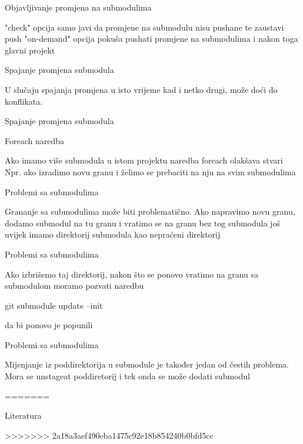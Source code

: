 \documentclass[10pt]{beamer}
\begin{document}
\begin{frame}[fragile]{Objavljivanje promjena na submodulima}
    
    "check" opcija samo javi da promjene na submodulu nisu pushane te zaustavi push
    "on-demand" opcija pokuša pushati promjene na submodulima i nakon toga glavni projekt
    
\end{frame}

\begin{frame}[fragile]{Spajanje promjena submodula}
    
    U slučaju spajanja promjena u isto vrijeme kad i netko drugi, može doći do konflikata.
    
    
\end{frame}

\begin{frame}[fragile]{Spajanje promjena submodula}
    
    
    
\end{frame}

\begin{frame}[fragile]{Foreach naredba}
    
    Ako imamo više submodula u istom projektu naredba foreach olakšava stvari
	Npr. ako izradimo novu granu i želimo se prebaciti na nju na svim submodulima
	
    
\end{frame}

\begin{frame}[fragile]{Problemi sa submodulima}
    
    Grananje sa submodulima može biti problematično.
    Ako napravimo novu granu, dodamo submodul na tu granu i vratimo se na granu bez tog submodula još uvijek imamo direktorij submodula kao nepraćeni direktorij
    
\end{frame}

\begin{frame}[fragile]{Problemi sa submodulima}
    
    Ako izbrišemo taj direktorij, nakon što se ponovo vratimo na granu sa submodulom moramo pozvati naredbu
    \begin{semiverbatim}git submodule update --init\end{semiverbatim}
    da bi ponovo je popunili
    
\end{frame}

\begin{frame}[fragile]{Problemi sa submodulima}
    
    Mijenjanje iz poddirektorija u submodule je također jedan od čestih problema.
    Mora se unstageat poddiretorij i tek onda se može dodati submodul
    
\end{frame}

=======
\begin{frame}[fragile]{Literatura}
	
  	
\end{frame}
>>>>>>> 2a18a3aef490eba1475c92e18b854240b0bfd5cc
\end{document}
